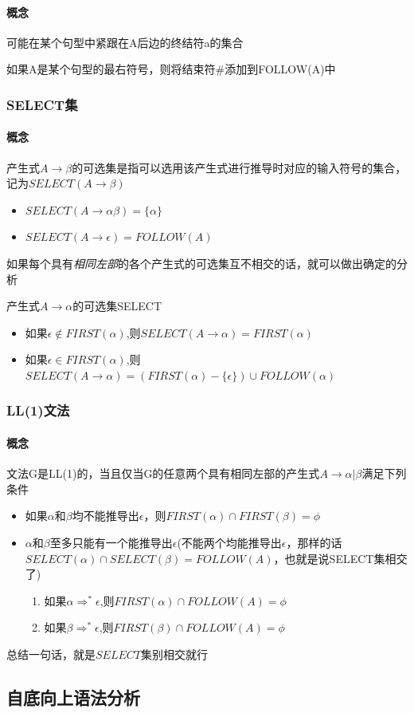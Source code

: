 \documentclass[UTF8]{ctexart} %
\begin{document}
\paragraph{概念} 可能在某个句型中紧跟在A后边的终结符a的集合

如果A是某个句型的最右符号，则将结束符\#添加到FOLLOW(A)中

\subsubsection{SELECT集}

\paragraph{概念} 产生式$A\rightarrow \beta$的可选集是指可以选用该产生式进行推导时对应的输入符号的集合，记为$SELECT(A\rightarrow \beta)$

\begin{itemize}
    \item $SELECT(A\rightarrow \alpha\beta)=\{\alpha\}$
    \item $SELECT(A\rightarrow \epsilon)=FOLLOW(A)$
\end{itemize}

如果每个具有\emph{相同左部}的各个产生式的可选集互不相交的话，就可以做出确定的分析

产生式$A\rightarrow \alpha$的可选集SELECT

\begin{itemize}
    \item 如果$\epsilon \notin FIRST(\alpha)$,则$SELECT(A\rightarrow\alpha)=FIRST(\alpha)$
    \item 如果$\epsilon \in FIRST(\alpha)$,则$SELECT(A\rightarrow\alpha)=(FIRST(\alpha)-\{\epsilon\})\cup FOLLOW(\alpha)$
\end{itemize}

\subsubsection{LL(1)文法}

\paragraph{概念} 文法G是LL(1)的，当且仅当G的任意两个具有相同左部的产生式$A\rightarrow \alpha|\beta$满足下列条件

\begin{itemize}
    \item 如果$\alpha$和$\beta$均不能推导出$\epsilon$，则$FIRST(\alpha)\cap FIRST(\beta)=\phi $
    \item $\alpha$和$\beta$至多只能有一个能推导出$\epsilon$(不能两个均能推导出$\epsilon$，那样的话$SELECT(\alpha)\cap SELECT(\beta)=FOLLOW(A)$，也就是说SELECT集相交了)
          \begin{enumerate}
              \item 如果$\alpha\Rightarrow^* \epsilon$,则$FIRST(\alpha)\cap FOLLOW(A)=\phi$
              \item 如果$\beta\Rightarrow^* \epsilon$,则$FIRST(\beta)\cap FOLLOW(A)=\phi$
          \end{enumerate}
\end{itemize}

总结一句话，就是$SELECT$集别相交就行

\subsection{自底向上语法分析}
\end{document}
